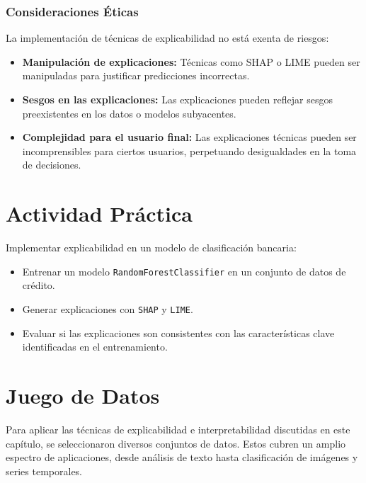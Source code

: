 \begin{refsection}
\subsubsection{Consideraciones Éticas}

La implementación de técnicas de explicabilidad no está exenta de riesgos:

\begin{itemize}
    \item \textbf{Manipulación de explicaciones:} Técnicas como SHAP o LIME pueden ser manipuladas para justificar predicciones incorrectas.
    \item \textbf{Sesgos en las explicaciones:} Las explicaciones pueden reflejar sesgos preexistentes en los datos o modelos subyacentes.
    \item \textbf{Complejidad para el usuario final:} Las explicaciones técnicas pueden ser incomprensibles para ciertos usuarios, perpetuando desigualdades en la toma de decisiones.
\end{itemize}



\section{Actividad Práctica}

Implementar explicabilidad en un modelo de clasificación bancaria:

\begin{itemize}
    \item Entrenar un modelo \texttt{RandomForestClassifier} en un conjunto de datos de crédito.
    \item Generar explicaciones con \texttt{SHAP} y \texttt{LIME}.
    \item Evaluar si las explicaciones son consistentes con las características clave identificadas en el entrenamiento.
\end{itemize}



\section{Juego de Datos}
Para aplicar las técnicas de explicabilidad e interpretabilidad discutidas en este capítulo, se seleccionaron diversos conjuntos de datos. Estos cubren un amplio espectro de aplicaciones, desde análisis de texto hasta clasificación de imágenes y series temporales.


\end{refsection}
